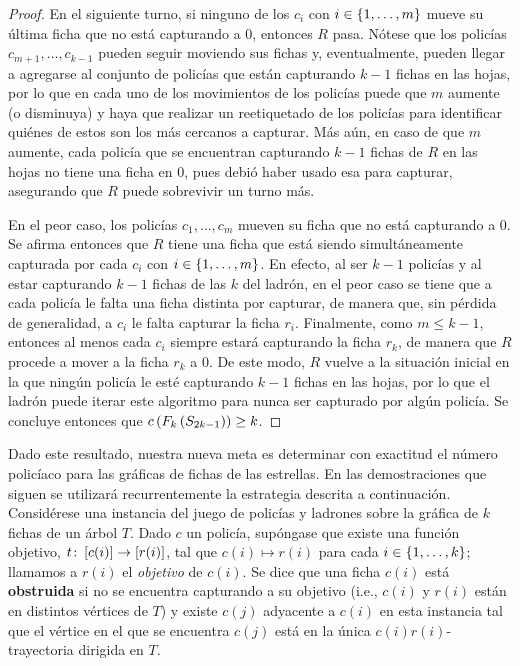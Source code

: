 \begin{proof}
    En el siguiente turno, si ninguno de los $c_{i}$ con $i\in\{1,\dots, m\}$ mueve
    su \'ultima ficha que no est\'a capturando a $0$, entonces $R$ pasa.
    N\'otese que los polic\'ias $c_{m+1},\dots,c_{{k-1}}$ pueden seguir moviendo
    sus fichas y, eventualmente, pueden llegar a agregarse al conjunto de
    polic\'ias que est\'an capturando $k-1$ fichas en las hojas, por lo que en
    cada uno de los movimientos de los polic\'ias puede que $m$ aumente (o
    disminuya) y haya que realizar un reetiquetado de los polic\'ias para
    identificar qui\'enes de estos son los m\'as cercanos a capturar. M\'as
    a\'un, en caso de que $m$ aumente, cada polic\'ia que se encuentran
    capturando $k-1$ fichas de $R$ en las hojas no tiene una ficha en $0$, pues
    debi\'o haber usado esa para capturar, asegurando que $R$ puede sobrevivir
    un turno m\'as.

    En el peor caso, los polic\'ias $c_1,\dots, c_m$ mueven su ficha que no
    est\'a capturando a $0$. Se afirma entonces que $R$ tiene una ficha que
    est\'a siendo simult\'aneamente capturada por cada $c_{i}$ con $i\in
    \{1,\dots, m\}$. En efecto, al ser $k-1$ polic\'ias y al estar capturando $k-1$
    fichas de las $k$ del ladr\'on, en el peor caso se tiene que a cada
    polic\'ia le falta una ficha distinta por capturar, de manera que, sin
    p\'erdida de generalidad, a $c_{i}$ le falta capturar la ficha $r_i$.
    Finalmente, como $m\leq k-1$, entonces al menos cada $c_{i}$ siempre
    estar\'a capturando la ficha $r_k$, de manera que $R$ procede a mover a la
    ficha $r_k$ a $0$. De este modo, $R$ vuelve a la situaci\'on inicial en la
    que ning\'un polic\'ia le est\'e capturando $k-1$ fichas en las hojas, por
    lo que el ladr\'on puede iterar este algoritmo para nunca ser capturado por
    alg\'un polic\'ia. Se concluye entonces que $c\left( F_{k}\left( S_{2k-1}\right)\right) \ge
    k$.
    
\end{proof}

Dado este resultado, nuestra nueva meta es determinar con exactitud el n\'umero
polic\'iaco para las gr\'aficas de fichas de las estrellas. En las
demostraciones que siguen se utilizar\'a recurrentemente la estrategia descrita
a continuaci\'on. Consid\'erese una instancia del juego de polic\'ias y ladrones
sobre la gr\'afica de $k$ fichas de un \'arbol $T$. Dado $c$ un polic\'ia,
sup\'ongase que existe una funci\'on objetivo, $t \colon \left[ c(i)\right]\to \left[ r(i)\right]$,
tal que $c(i)\mapsto r(i)$ para cada $i\in\{1,\dots, k\}$; llamamos a $r(i)$ el
\textit{objetivo} de $c(i)$. Se dice que una ficha $c(i)$ est\'a
\textbf{obstruida} si no se encuentra capturando a su objetivo (i.e., $c(i)$ y
$r(i)$ est\'an en distintos v\'ertices de $T$) y existe $c(j)$ adyacente a
$c(i)$ en esta instancia tal que el v\'ertice en el que se encuentra $c(j)$
est\'a en la \'unica $c(i)r(i)$-trayectoria dirigida en $T$.

